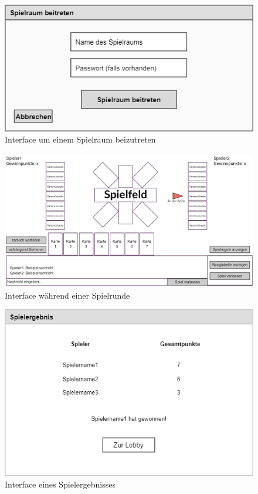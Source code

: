 \begin{figure}
	\centering
	\includegraphics[width=1.1\textwidth]{SEP_Lasten_Pflichtenheft/img/Spielraum_beitreten.png}
	\caption{Interface um einem Spielraum beizutreten}
	\label{gui:spielraum_beitreten}
\end{figure}

\begin{figure}
	\centering
	\includegraphics[width=1.1\textwidth]{SEP_Lasten_Pflichtenheft/img/Ingame.png}
	\caption{Interface während einer Spielrunde}
	\label{gui:spiel}
\end{figure}

\begin{figure}
	\centering
	\includegraphics[width=1.1\textwidth]{SEP_Lasten_Pflichtenheft/img/Spielergebnis.png}
	\caption{Interface eines Spielergebnisses}
	\label{gui:spielergebnis}
\end{figure}

